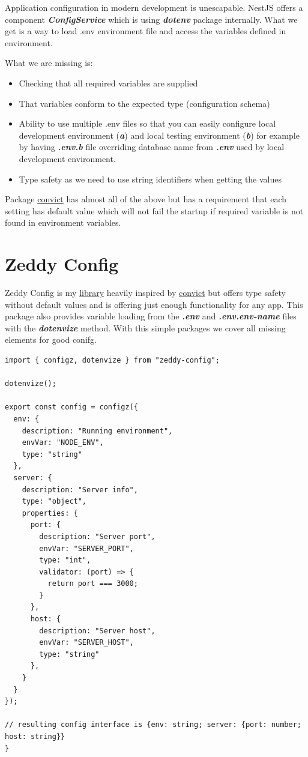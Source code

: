 \documentclass[lang=en,color=green]{elegantbook}
\newcommand{\bi}[1]{\textit{\textbf{#1}}}
\begin{document}
Application configuration in modern development is unescapable. NestJS 
offers a component \bi{ConfigService} which is using \bi{dotenv} package internally.
What we get is a way to load .env environment file and access the variables
defined in environment.

What we are missing is:
\begin{itemize}
    \item Checking that all required variables are supplied
    \item That variables conform to the expected type (configuration schema)
    \item Ability to use multiple .env files so that you can easily configure 
    local development environment (\bi{a}) and local testing environment (\bi{b})
    for example by having \bi{.env.b} file overriding database name from \bi{.env} 
    used by local development environment.
    \item Type safety as we need to use string identifiers when getting the 
    values
\end{itemize}

Package \href{https://www.npmjs.com/package/convict}{convict} has almost all
of the above but has a requirement that each setting has default value 
which will not fail the startup if required variable is not found in 
environment variables.

\section*{Zeddy Config}
Zeddy Config is my \href{https://www.npmjs.com/package/zeddy-config}{library} 
heavily inspired by \href{https://www.npmjs.com/package/convict}{convict} but offers 
type safety without default values and is offering just enough functionality
for any app. This package also provides variable loading from the \bi{.env} 
and \bi{.env.env-name} files with the \bi{dotenvize} method. With this simple
packages we cover all missing elements for good conifg.

\begin{verbatim}
import { configz, dotenvize } from "zeddy-config";

dotenvize();

export const config = configz({
  env: {
    description: "Running environment",
    envVar: "NODE_ENV",
    type: "string"
  },
  server: {
    description: "Server info",
    type: "object",
    properties: {
      port: {
        description: "Server port",
        envVar: "SERVER_PORT",
        type: "int",
        validator: (port) => {
          return port === 3000;
        }
      },
      host: {
        description: "Server host",
        envVar: "SERVER_HOST",
        type: "string"
      },
    }
  }
});

// resulting config interface is {env: string; server: {port: number; host: string}}
}
\end{verbatim}
\end{document}
